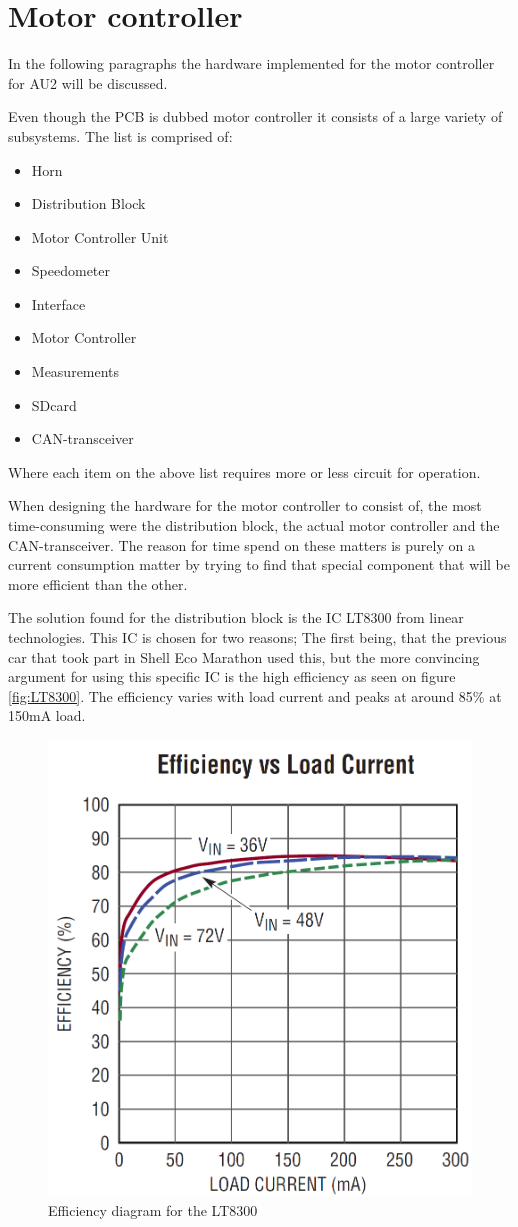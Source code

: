 \section{Motor controller}
In the following paragraphs the hardware implemented for the motor controller for AU2 will be discussed. 

Even though the PCB is dubbed motor controller it consists of a large variety of subsystems. The list is comprised of: 

\begin{itemize}
	\item{Horn}
	\item{Distribution Block}
	\item{Motor Controller Unit}
	\item{Speedometer}
	\item{Interface}
	\item{Motor Controller}
	\item{Measurements}
	\item{SDcard}
	\item{CAN-transceiver}
\end{itemize}

Where each item on the above list requires more or less circuit for operation. 

When designing the hardware for the motor controller to consist of, the most time-consuming were the distribution block, the actual motor controller and the CAN-transceiver. The reason for time spend on these matters is purely on a current consumption matter by trying to find that special component that will be more efficient than the other. 

The solution found for the distribution block is the IC LT8300\cite{LT8300} from linear technologies. This IC is chosen for two reasons; The first being, that the previous car that took part in Shell Eco Marathon used this, but the more convincing argument for using this specific IC is the high efficiency as seen on figure \vref{fig:LT8300}. The efficiency varies with load current and peaks at around 85\% at 150mA load.  

\begin{figure}[H]
	\centering
	\includegraphics[width=0.5\linewidth]{Hardware/Pictures/LT8300}
	\caption{Efficiency diagram for the LT8300}
	\label{fig:LT8300}
\end{figure}

